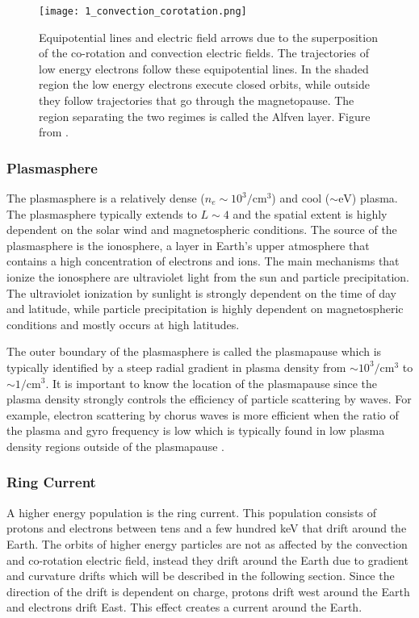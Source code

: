 \begin{figure}
\texttt{[image: 1\_convection\_corotation.png]}
\caption{Equipotential lines and electric field arrows due to the superposition of the co-rotation and convection electric fields. The trajectories of low energy electrons follow these equipotential lines. In the shaded region the low energy electrons execute closed orbits, while outside they follow trajectories that go through the magnetopause. The region separating the two regimes is called the Alfven layer. Figure from \citet{Baumjohann1997}.}
\label{Intro:E_fields}
\end{figure}

\subsubsection{Plasmasphere}
The plasmasphere is a relatively dense ($n_e \sim 10^3/\mathrm{cm}^3$) and cool ($\sim \mathrm{eV}$) plasma. The plasmasphere typically extends to $L \sim 4$ and the spatial extent is highly dependent on the solar wind and magnetospheric conditions. The source of the plasmasphere is the ionosphere, a layer in Earth's upper atmosphere that contains a high concentration of electrons and ions. The main mechanisms that ionize the ionosphere are ultraviolet light from the sun and particle precipitation. The ultraviolet ionization by sunlight is strongly dependent on the time of day and latitude, while particle precipitation is highly dependent on magnetospheric conditions and mostly occurs at high latitudes.

The outer boundary of the plasmasphere is called the plasmapause which is typically identified by a steep radial gradient in plasma density from $\sim 10^3 / \mathrm{cm}^3$ to $\sim 1 / \mathrm{cm}^3$. It is important to know the location of the plasmapause since the plasma density strongly controls the efficiency of particle scattering by waves. For example, electron scattering by chorus waves is more efficient when the ratio of the plasma and gyro frequency is low which is typically found in low plasma density regions outside of the plasmapause \citep[e.g.][]{Horne2003c, Horne2005, O'Brien2003empirical}.

\subsubsection{Ring Current}
A higher energy population is the ring current. This population consists of protons and electrons between tens and a few hundred keV that drift around the Earth. The orbits of higher energy particles are not as affected by the convection and co-rotation electric field, instead they drift around the Earth due to gradient and curvature drifts which will be described in the following section. Since the direction of the drift is dependent on charge, protons drift west around the Earth and electrons drift East. This effect creates a current around the Earth. 

